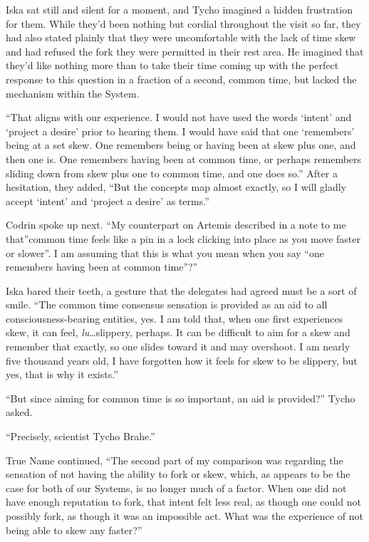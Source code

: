Iska sat still and silent for a moment, and Tycho imagined a hidden frustration for them. While they'd been nothing but cordial throughout the visit so far, they had also stated plainly that they were uncomfortable with the lack of time skew and had refused the fork they were permitted in their rest area. He imagined that they'd like nothing more than to take their time coming up with the perfect response to this question in a fraction of a second, common time, but lacked the mechanism within the System.

``That aligns with our experience. I would not have used the words `intent' and `project a desire' prior to hearing them. I would have said that one `remembers' being at a set skew. One remembers being or having been at skew plus one, and then one is. One remembers having been at common time, or perhaps remembers sliding down from skew plus one to common time, and one does so.'' After a hesitation, they added, ``But the concepts map almost exactly, so I will gladly accept `intent' and `project a desire' as terms.''

Codrin spoke up next. ``My counterpart on Artemis described in a note to me that''common time feels like a pin in a lock clicking into place as you move faster or slower''. I am assuming that this is what you mean when you say ``one remembers having been at common time''?''

Iska bared their teeth, a gesture that the delegates had agreed must be a sort of smile. ``The common time consensus sensation is provided as an aid to all consciousness-bearing entities, yes. I am told that, when one first experiences skew, it can feel, \emph{lu}\ldots slippery, perhaps. It can be difficult to aim for a skew and remember that exactly, so one slides toward it and may overshoot. I am nearly five thousand years old, I have forgotten how it feels for skew to be slippery, but yes, that is why it exists.''

``But since aiming for common time is so important, an aid is provided?'' Tycho asked.

``Precisely, scientist Tycho Brahe.''

True Name continued, ``The second part of my comparison was regarding the sensation of not having the ability to fork or skew, which, as appears to be the case for both of our Systems, is no longer much of a factor. When one did not have enough reputation to fork, that intent felt less real, as though one could not possibly fork, as though it was an impossible act. What was the experience of not being able to skew any faster?''

